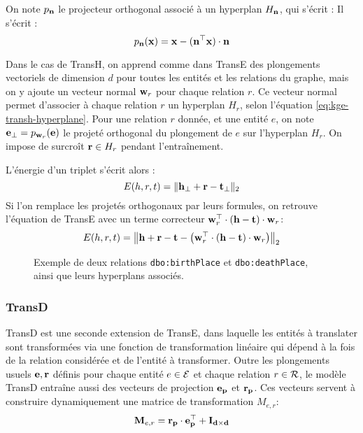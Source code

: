 On note $p_{\bf{n}}$ le projecteur orthogonal associé à un hyperplan $H_{\bf{n}}$, qui s'écrit : %
Il s'écrit :
\begin{equation}
    p_{\bf{n}}(\bf{x}) = \bf{x - (n^\top x) \cdot n}
\end{equation}

Dans le cas de TransH, on apprend comme dans TransE des plongements vectoriels de dimension $d$ pour toutes les entités et les relations du graphe, mais on y ajoute un vecteur normal $\bf{w}_r$ pour chaque relation $r$. Ce vecteur normal permet d'associer à chaque relation $r$ un hyperplan $H_r$, selon l'équation \ref{eq:kge-transh-hyperplane}.
%
Pour une relation $r$ donnée, et une entité $e$, on note $\bf{e_\bot} = p_{\bf{w}_r}(\bf{e})$ le projeté orthogonal du plongement de $e$ sur l'hyperplan $H_r$. On impose de surcroît $\bf{r} \in H_r$ pendant l'entraînement.

L'énergie d'un triplet s'écrit alors :
\begin{equation}
    E(h, r, t) = \| \bf{h_\bot + r - t_\bot} \|_2
    \label{eq:kge-transh-main}
\end{equation}
Si l'on remplace les projetés orthogonaux par leurs formules, on retrouve l'équation de TransE avec un terme correcteur $\bf{w}_r^\top \cdot (\bf{h - t}) \cdot \bf{w}_r$:
\begin{equation}
    E(h, r, t) = \left\| \bf{h + r - t} - \left( \bf{w}_r^\top \cdot (\bf{h - t}) \cdot \bf{w}_r \right) \right\|_2
    \label{eq:kge-transh-long}
\end{equation}

\begin{figure}[hbt]
    \centering
    
    \caption[Exemple des possibilités laissées par TransH]{Exemple de deux relations \texttt{dbo:birthPlace} et \texttt{dbo:deathPlace}, ainsi que leurs hyperplans associés.}
    \label{fig:transh-dual}
\end{figure}

\subsubsection{TransD \cite{transd}}

TransD est une seconde extension de TransE, dans laquelle les entités à translater sont transformées via une fonction de transformation linéaire qui dépend à la fois de la relation considérée et de l'entité à transformer. Outre les plongements usuels $\bf{e}, \bf{r}$ définis pour chaque entité $e \in \Ent $ et chaque relation $r \in \Rel$, le modèle TransD entraîne aussi des vecteurs de projection $\bf{e_p}$ et $\bf{r_p}$. Ces vecteurs servent à construire dynamiquement une matrice de transformation $M_{e, r}$:
\begin{equation}
    \label{eq:kge-transd-matrix}
    \bf{M}_{e, r} = \bf{r_p \cdot e_p^\top + I_{d \times d}}
\end{equation}

